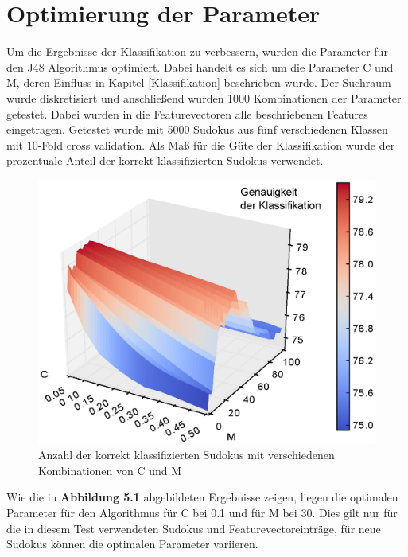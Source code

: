 \section{Optimierung der Parameter}
\label{Parameteroptimierung}
Um die Ergebnisse der Klassifikation zu verbessern, wurden die Parameter für den J48 Algorithmus optimiert. Dabei handelt es sich um die Parameter C und M, deren Einfluss in Kapitel \ref{Klassifikation} beschrieben wurde. Der Suchraum wurde diskretisiert und anschließend wurden 1000 Kombinationen der Parameter getestet. Dabei wurden in die Featurevectoren alle beschriebenen Features eingetragen. Getestet wurde mit 5000 Sudokus aus fünf verschiedenen Klassen mit 10-Fold cross validation. Als Maß für die Güte der Klassifikation wurde der prozentuale Anteil der korrekt klassifizierten Sudokus verwendet.
\begin{figure}[Hh]
    \includegraphics[scale=0.9]{./img/parameter.eps}
    \caption{Anzahl der korrekt klassifizierten Sudokus mit verschiedenen Kombinationen von C und M}
\end{figure}

\noindent Wie die in \textbf{Abbildung 5.1} abgebildeten Ergebnisse zeigen, liegen die optimalen Parameter für den Algorithmus für C bei 0.1 und für M bei 30. Dies gilt nur für die in diesem Test verwendeten Sudokus und Featurevectoreinträge, für neue Sudokus können die optimalen Parameter variieren.